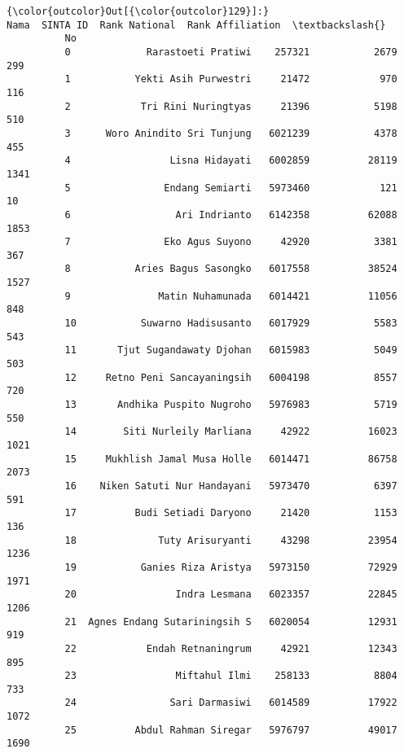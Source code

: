 \documentclass[11pt]{article}
\begin{document}
            \begin{Verbatim}[commandchars=\\\{\}]
{\color{outcolor}Out[{\color{outcolor}129}]:}                             Nama  SINTA ID  Rank National  Rank Affiliation  \textbackslash{}
          No                                                                            
          0             Rarastoeti Pratiwi    257321           2679               299   
          1           Yekti Asih Purwestri     21472            970               116   
          2            Tri Rini Nuringtyas     21396           5198               510   
          3      Woro Anindito Sri Tunjung   6021239           4378               455   
          4                 Lisna Hidayati   6002859          28119              1341   
          5                Endang Semiarti   5973460            121                10   
          6                  Ari Indrianto   6142358          62088              1853   
          7                Eko Agus Suyono     42920           3381               367   
          8           Aries Bagus Sasongko   6017558          38524              1527   
          9               Matin Nuhamunada   6014421          11056               848   
          10           Suwarno Hadisusanto   6017929           5583               543   
          11       Tjut Sugandawaty Djohan   6015983           5049               503   
          12     Retno Peni Sancayaningsih   6004198           8557               720   
          13       Andhika Puspito Nugroho   5976983           5719               550   
          14        Siti Nurleily Marliana     42922          16023              1021   
          15     Mukhlish Jamal Musa Holle   6014471          86758              2073   
          16    Niken Satuti Nur Handayani   5973470           6397               591   
          17          Budi Setiadi Daryono     21420           1153               136   
          18              Tuty Arisuryanti     43298          23954              1236   
          19           Ganies Riza Aristya   5973150          72929              1971   
          20                 Indra Lesmana   6023357          22845              1206   
          21  Agnes Endang Sutariningsih S   6020054          12931               919   
          22            Endah Retnaningrum     42921          12343               895   
          23                 Miftahul Ilmi    258133           8804               733   
          24                Sari Darmasiwi   6014589          17922              1072   
          25          Abdul Rahman Siregar   5976797          49017              1690   

\end{Verbatim}
\end{document}
